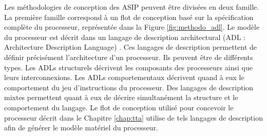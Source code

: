Les méthodologies de conception des ASIP peuvent être divisées en deux famille. La première famille correspond à un flot de conception basé sur la spécification complète du processeur, représentée dans la Figure \ref{fig:methodo_adl}. Le modèle du processeur est décrit dans un langage de description architectural (ADL : Architecture Description Language) \cite{mishra2011processor}. Ces langages de description permettent de définir précisément l'architecture d'un processeur. Ils peuvent être de différents types. Les ADLs structurels décrivent les composants des processeurs ainsi que leurs interconnexions. Les ADLs comportementaux décrivent quand à eux le comportement du jeu d'instructions du processeur. Des langages de description mixtes permettent quant à eux de décrire simultanément la structure et le comportement du langage. Le flot de conception utilisé pour concevoir le processeur décrit dans le Chapitre \ref{chap:tta} utilise de tels langages de description afin de générer le modèle matériel du processeur.


